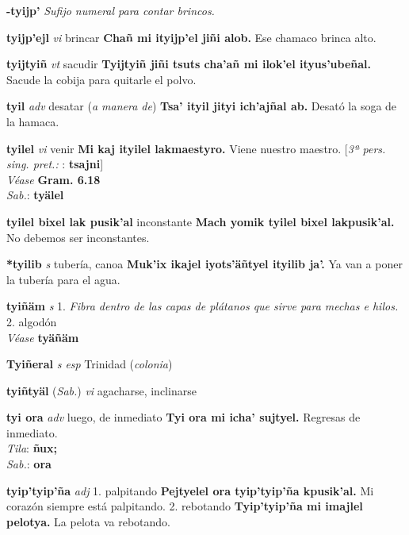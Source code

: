 \documentclass[10pt]{scrbook}
\newcommand{\entry}[1]{\textbf{#1}}
\newcommand{\onedefinition}[1]{#1.}
\newcommand{\nontranslationdef}[1]{\textit{#1}}
\newcommand{\partofspeech}[1]{\textit{#1}}
\newcommand{\spanishtranslation}[1]{#1}
\newcommand{\clarification}[1]{(\textit{#1})}
\newcommand{\cholexample}[1]{\textbf{#1}}
\newcommand{\exampletranslation}[1]{#1}
\newcommand{\dialectvariant}[1]{\\\textit{#1}:}
\newcommand{\dialectword}[1]{\textbf{#1}}
\newcommand{\alsosee}[1]{\\\textit{Véase} \textbf{#1}}
\newcommand{\relevantdialect}[1]{(\textit{#1})}
\newcommand{\conjugationtense}[1]{[\textit{#1}}
\newcommand{\otherconjugation}[1]{: \textbf{#1}]}
\begin{document}
\begin{multicols}{2}
\entry{-tyijp'}
\nontranslationdef{Sufijo numeral para contar brincos.}

\entry{tyijp'ejl}
\partofspeech{vi}
\spanishtranslation{brincar}
\cholexample{Chañ mi ityijp'el jiñi alob.}
\exampletranslation{Ese chamaco brinca alto.}

\entry{tyijtyiñ}
\partofspeech{vt}
\spanishtranslation{sacudir}
\cholexample{Tyijtyiñ jiñi tsuts cha'añ mi ilok'el ityus'ubeñal.}
\exampletranslation{Sacude la cobija para quitarle el polvo.}

\entry{tyil}
\partofspeech{adv}
\spanishtranslation{desatar}
\clarification{a manera de}
\cholexample{Tsa' ityil jityi ich'ajñal ab.}
\exampletranslation{Desató la soga de la hamaca.}

\entry{tyilel}
\partofspeech{vi}
\spanishtranslation{venir}
\cholexample{Mi kaj ityilel lakmaestyro.}
\exampletranslation{Viene nuestro maestro.}
\conjugationtense{3ª pers. sing. pret.:}
\otherconjugation{tsajni}
\alsosee{Gram. 6.18}
\dialectvariant{Sab.}
\dialectword{tyälel}

\entry{tyilel bixel lak pusik'al}
\spanishtranslation{inconstante}
\cholexample{Mach yomik tyilel bixel lakpusik'al.}
\exampletranslation{No debemos ser inconstantes.}

\entry{*tyilib}
\partofspeech{s}
\spanishtranslation{tubería, canoa}
\cholexample{Muk'ix ikajel iyots'äñtyel ityilib ja'.}
\exampletranslation{Ya van a poner la tubería para el agua.}

\entry{tyiñäm}
\partofspeech{s}
\onedefinition{1}
\nontranslationdef{Fibra dentro de las capas de plátanos que sirve para mechas e hilos.}
\onedefinition{2}
\spanishtranslation{algodón}
\alsosee{tyäñäm}

\entry{Tyiñeral}
\partofspeech{s esp}
\spanishtranslation{Trinidad}
\clarification{colonia}

\entry{tyiñtyäl}
\relevantdialect{Sab.}
\partofspeech{vi}
\spanishtranslation{agacharse, inclinarse}

\entry{tyi ora}
\partofspeech{adv}
\spanishtranslation{luego, de inmediato}
\cholexample{Tyi ora mi icha' sujtyel.}
\exampletranslation{Regresas de inmediato.}
\dialectvariant{Tila}
\dialectword{ñux;}
\dialectvariant{Sab.}
\dialectword{ora}

\entry{tyip'tyip'ña}
\partofspeech{adj}
\onedefinition{1}
\spanishtranslation{palpitando}
\cholexample{Pejtyelel ora tyip'tyip'ña kpusik'al.}
\exampletranslation{Mi corazón siempre está palpitando.}
\onedefinition{2}
\spanishtranslation{rebotando}
\cholexample{Tyip'tyip'ña mi imajlel pelotya.}
\exampletranslation{La pelota va rebotando.}


\end{multicols}
\end{document}
